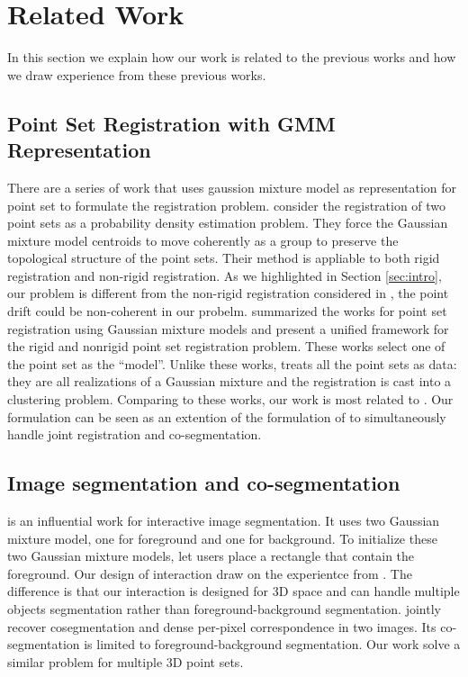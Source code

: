 \section{Related Work}
\label{sec:rw}
In this section we explain how our work is related to the previous works and how we draw experience from these previous works.
\subsection{Point Set Registration with GMM Representation}
\label{subsec:gmmreg}
There are a series of work that uses gaussion mixture model as representation for point set to formulate the registration problem.
\cite{CPD} consider the registration of two point sets as a probability density estimation problem. They force the Gaussian mixture model centroids to move coherently as a group to preserve the topological structure of the point sets. Their method is appliable to both rigid registration and non-rigid registration. As we highlighted in Section \ref{sec:intro}, our problem is different from the non-rigid registration considered in \cite{CPD}, the point drift could be non-coherent in our probelm.\cite{GMM_PAMI} summarized the works for point set registration using Gaussian mixture models and present a unified framework for the rigid and nonrigid point set registration problem. These works select one of the point set as the ``model''. Unlike these works, \cite{Evangelidis2014} treats all the point sets as data: they are all realizations of a Gaussian mixture and the registration is cast into a clustering problem. Comparing to these works, our work is most related to \cite{Evangelidis2014}. Our formulation can be seen as an extention of the formulation of \cite{Evangelidis2014} to simultaneously handle joint registration and co-segmentation.
\subsection{Image segmentation and co-segmentation}
\label{subsec:coseg}
\cite{grabcut} is an influential work for interactive image segmentation. It uses two Gaussian mixture model, one for foreground and one for background. To initialize these two Gaussian mixture models, \cite{grabcut} let users place a rectangle that contain the foreground. Our design of interaction draw on the experientce from \cite{grabcut}. The difference is that our interaction is designed for 3D space and can handle multiple objects segmentation rather than foreground-background segmentation. \cite{Taniai_2016_CVPR} jointly recover cosegmentation and dense per-pixel correspondence in two images. Its co-segmentation is limited to foreground-background segmentation. Our work solve a similar problem for multiple 3D point sets. 

